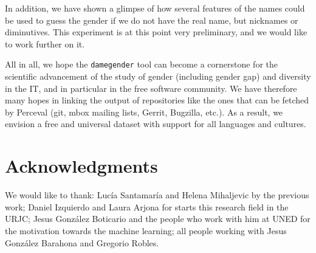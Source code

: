 \documentclass[a4paper]{article}
\begin{document}
In addition, we have shown a glimpse of how several features of the names could be used to guess the gender if we do not have the real name, but nicknames or diminutives.
This experiment is at this point very preliminary, and we would like to work further on it.

All in all, we hope the \texttt{damegender} tool can become a cornerstone for the scientific advancement of the study of gender (including gender gap) and diversity in the IT, and in particular in the free software community.
We have therefore many hopes in linking the output of repositories like the ones that can be fetched by Perceval (git, mbox mailing lists, Gerrit, Bugzilla, etc.).
As a result, we envision a free and universal dataset with support for all languages and cultures.


\section*{Acknowledgments}

We would like to thank: Lucía Santamaría and Helena Mihaljevic by the previous work; Daniel Izquierdo and Laura Arjona for starts this research field in the URJC; Jesus González Boticario and the people who work with him at UNED for the motivation towards the machine learning; all people working with Jesus González Barahona and Gregorio Robles.

 

\end{document}
